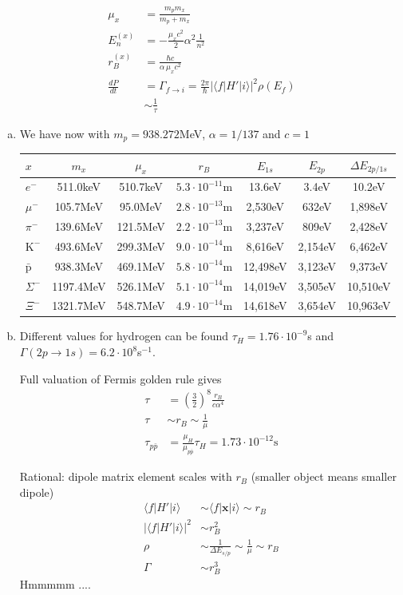 \documentclass[10pt,a4paper]{book}
\theoremstyle{definition}
\begin{document}
\begin{align}
\mu_x&=\frac{m_pm_x}{m_p+m_x}\\
E_n^{(x)}&=-\frac{\mu_x c^2}{2}\alpha^2\frac{1}{n^2}\\
r_B^{(x)}&=\frac{\hbar c}{\alpha\, \mu_x c^2}\\
\frac{dP}{dt}&=\Gamma_{f\rightarrow i}=\frac{2\pi}{\hbar}|\langle f|H'|i\rangle|^2\rho(E_f)\\
&\sim\frac{1}{\tau}
\end{align}
\begin{enumerate}[(a)]
\item We have now with $m_p=938.272$MeV, $\alpha=1/137$ and $c=1$ 
\begin{center}
\begin{tabular}{lcccccc}
$x$              & $m_x$       & $\mu_x$ & $r_B$ & $E_{1s}$ & $E_{2p}$ & $\Delta E_{2p/1s}$ \\ \hline
$e^-$            & 511.0keV  & 510.7keV & $5.3\cdot10^{-11}$m &   13.6eV &   3.4eV &  10.2eV\\
$\mu^-$          & 105.7MeV  &  95.0MeV & $2.8\cdot10^{-13}$m &  2,530eV &   632eV & 1,898eV\\
$\pi^-$          & 139.6MeV  & 121.5MeV & $2.2\cdot10^{-13}$m &  3,237eV &   809eV & 2,428eV\\
$\text{K}^-$     & 493.6MeV  & 299.3MeV & $9.0\cdot10^{-14}$m &  8,616eV & 2,154eV & 6,462eV\\
$\bar{\text{p}}$ & 938.3MeV  & 469.1MeV & $5.8\cdot10^{-14}$m & 12,498eV & 3,123eV & 9,373eV\\
$\Sigma^-$       & 1197.4MeV & 526.1MeV & $5.1\cdot10^{-14}$m & 14,019eV & 3,505eV & 10,510eV\\
$\Xi^-$          & 1321.7MeV & 548.7MeV & $4.9\cdot10^{-14}$m & 14,618eV & 3,654eV & 10,963eV
\end{tabular}
\end{center}

\item Different values for hydrogen can be found $\tau_H=1.76\cdot10^{-9}$s and $\Gamma(2p\rightarrow1s) =6.2\cdot10^8$s$^{-1}$.

Full valuation of Fermis golden rule gives
\begin{align}
\tau&=\left(\frac{3}{2}\right)^8\frac{r_B}{c\alpha^4}\\
\tau&\sim r_B\sim\frac{1}{\mu}\\
\tau_{p\bar{p}}&=\frac{\mu_H}{\mu_{p\bar{p}}}\tau_H=1.73\cdot10^{-12}\text{s}
\end{align}

Rational: dipole matrix element scales with $r_B$ (smaller object means smaller dipole)
\begin{align}
\langle f|H'|i\rangle &\sim \langle f|\mathbf{x}|i\rangle\sim r_B\\
|\langle f|H'|i\rangle|^2 &\sim r_B^2\\
\rho&\sim \frac{1}{\Delta E_{s/p}}\sim\frac{1}{\mu}\sim r_B\\
\Gamma&\sim r_B^3
\end{align}
Hmmmmm ....

\end{enumerate}
\end{document}
